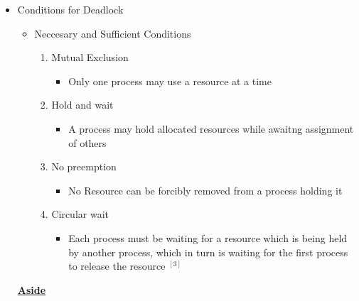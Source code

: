 \documentclass[12pt]{article}
\begin{document}
\begin{itemize}
    \item Conditions for Deadlock
    \begin{itemize}
        \item Neccesary and Sufficient Conditions
        \begin{enumerate}[1.]
            \item Mutual Exclusion
            \begin{itemize}
                \item Only one process may use a resource at a time
            \end{itemize}
            \item Hold and wait
            \begin{itemize}
                \item A process may hold allocated resources while awaitng
                assignment of others
            \end{itemize}
            \item No preemption
            \begin{itemize}
                \item No Resource can be forcibly removed from a process holding
                it
            \end{itemize}
            \item Circular wait
            \begin{itemize}
                \item Each process must be waiting for a resource which is being
                held by another process, which in turn is waiting for the first
                process to release the resource $^{[3]}$
            \end{itemize}
        \end{enumerate}
    \end{itemize}

    \bigskip

    \begin{mdframed}
        \underline{\textbf{Aside}}

        \bigskip


\end{mdframed}
\end{itemize}
\end{document}
